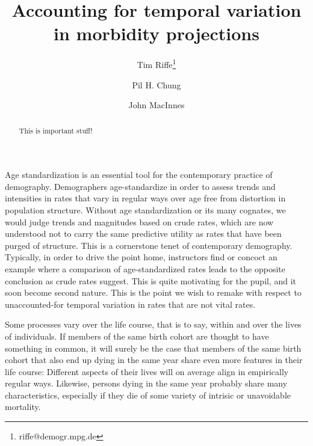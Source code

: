 \documentclass[11pt,oneside,a4paper]{article} %
\begin{document}
\title{Accounting for temporal variation in morbidity projections}

\author[1]{Tim Riffe\thanks{riffe@demogr.mpg.de}}
\author[2]{Pil H. Chung}
\author[3]{John MacInnes}


\maketitle

\begin{abstract}
This is important stuff!
\end{abstract}

Age standardization is an essential tool for the contemporary practice of
demography. Demographers age-standardize in order to assess trends and
intensities in rates that vary in regular ways over age free from distortion in
population structure. Without age standardization or its many cognates, we
would judge trends and magnitudes based on crude rates, which are now understood
not to carry the same predictive utility as rates that have been purged of
structure. This is a cornerstone tenet of contemporary demography. Typically, in
order to drive the point home, instructors find or concoct an example where a
comparison of age-standardized rates leads to the opposite conclusion as crude
rates suggest. This is quite motivating for the pupil, and it soon become second
nature. This is the point we wish to remake with respect to unaccounted-for
temporal variation in rates that are not vital rates.

Some processes vary over the life course, that is to say, within and over the
lives of individuals. If members of the same birth cohort are thought to have
something in common, it will surely be the case that members of the same birth
cohort that also end up dying in the same year share even more features in their
life course: Different aspects of their lives will on average align in
empirically regular ways. Likewise, persons dying in the same year probably
share many characteristics, especially if they die of some variety of intrisic
or unavoidable mortality.
\end{document}
